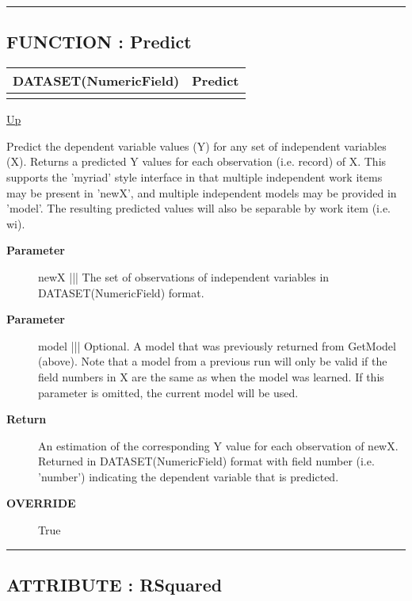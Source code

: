 \rule{\textwidth}{0.4pt}
\subsection*{FUNCTION : Predict}
\hypertarget{ecldoc:linearregression.ols.predict}{}

{\renewcommand{\arraystretch}{1.5}
\begin{tabularx}{\textwidth}{|>{\raggedright\arraybackslash}l|X|}
\hline
\hspace{0pt}DATASET(NumericField) & Predict \\
\hline
\multicolumn{2}{|>{\raggedright\arraybackslash}X|}{\hspace{0pt}(DATASET(NumericField) newX, DATASET(Layout\_Model) model=GetModel)} \\
\hline
\end{tabularx}
}

\hyperlink{ecldoc:linearregression.ols}{Up}

\par
Predict the dependent variable values (Y) for any set of independent variables (X). Returns a predicted Y values for each observation (i.e. record) of X. This supports the 'myriad' style interface in that multiple independent work items may be present in 'newX', and multiple independent models may be provided in 'model'. The resulting predicted values will also be separable by work item (i.e. wi).

\par
\begin{description}
\item [\textbf{Parameter}] newX ||| The set of observations of independent variables in DATASET(NumericField) format.
\item [\textbf{Parameter}] model ||| Optional. A model that was previously returned from GetModel (above). Note that a model from a previous run will only be valid if the field numbers in X are the same as when the model was learned. If this parameter is omitted, the current model will be used.
\item [\textbf{Return}] An estimation of the corresponding Y value for each observation of newX. Returned in DATASET(NumericField) format with field number (i.e. 'number') indicating the dependent variable that is predicted.
\item [\textbf{OVERRIDE}] True
\end{description}

\rule{\textwidth}{0.4pt}
\subsection*{ATTRIBUTE : RSquared}
\hypertarget{ecldoc:linearregression.ols.rsquared}{}


